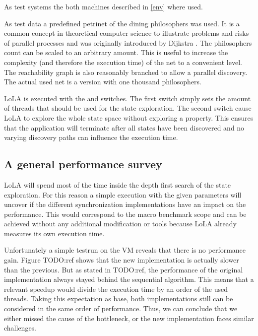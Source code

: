 As test systems the both machines described in \ref{env} where used.

As test data a predefined petrinet of the dining philosophers was used. It is a common concept in theoretical computer science to illustrate problems and risks of parallel processes and was originally introduced by Dijkstra \cite{dijkstra1971hierarchical}. The philosophers count can be scaled to an arbitrary amount. This is useful to increase the complexity (and therefore the execution time) of the net to a convenient level. The reachability graph is also reasonably branched to allow a parallel discovery. The actual used net is a version with one thousand philosophers.

LoLA is executed with the  and  switches. The first switch simply sets the amount of threads that should be used for the state exploration. The second switch cause LoLA to explore the whole state space without exploring a property. This ensures that the application will terminate after all states have been discovered and no varying discovery paths can influence the execution time.

\subsection{A general performance survey}
LoLA will spend most of the time inside the depth first search of the state exploration. For this reason a simple execution with the given parameters will uncover if the different synchronization implementations have an impact on the performance. This would correspond to the macro benchmark scope and can be achieved without any additional modification or tools because LoLA already measures its own execution time.

Unfortunately a simple testrun on the VM reveals that there is no performance gain. Figure TODO:ref shows that the new implementation is actually slower than the previous. But as stated in TODO:ref, the performance of the original implementation always stayed behind the sequential algorithm. This means that a relevant speedup would divide the execution time by an order of the used threads. Taking this expectation as base, both implementations still can be considered in the same order of performance. Thus, we can conclude that we either missed the cause of the bottleneck, or the new implementation faces similar challenges.



